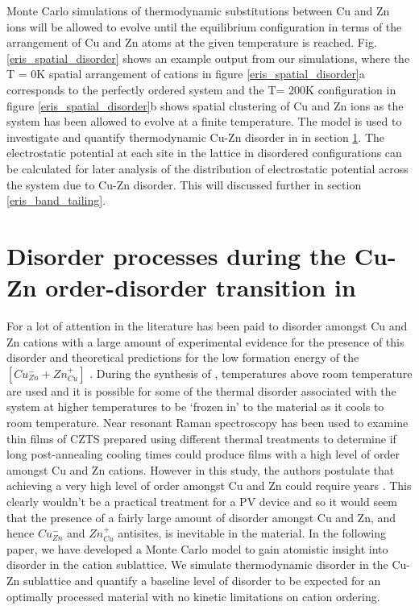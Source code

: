\documentclass[11pt, twoside]{report}
\begin{document}
Monte Carlo simulations of thermodynamic substitutions between Cu and Zn ions will be allowed to evolve until the equilibrium configuration in terms of the arrangement of Cu and Zn atoms at the given temperature is reached. Fig. \ref{eris_spatial_disorder} shows an example output from our simulations, where the T = 0K spatial arrangement of cations in figure \ref{eris_spatial_disorder}a corresponds to the perfectly ordered system and the T= 200K configuration in figure \ref{eris_spatial_disorder}b shows spatial clustering of Cu and Zn ions as the system has been allowed to evolve at a finite temperature. The model is used to investigate and quantify thermodynamic Cu-Zn disorder in {\CZTS} in section \ref{CZTS_MC}. The electrostatic potential at each site in the lattice in disordered configurations can be calculated for later analysis of the distribution of electrostatic potential across the system due to Cu-Zn disorder. This will discussed further in section \ref{eris_band_tailing}. 




\section{Disorder processes during the Cu-Zn order-disorder transition in {\CZTS}}\label{CZTS_MC}
For {\CZTS} a lot of attention in the literature has been paid to disorder amongst Cu and Zn cations with a large amount of experimental evidence for the presence of this disorder \cite{Schorr, CZTS_Xray, CZTS_TEM} and theoretical predictions for the low formation energy of the  $[Cu_{Zn}^{-} + Zn_{Cu}^{+}]$ \cite{defects_Chen}.
During the synthesis of {\CZTS}, temperatures above room temperature are used and it is possible for some of the thermal disorder associated with the system at higher temperatures to be `frozen in' to the material as it cools to room temperature.
Near resonant Raman spectroscopy has been used to examine thin films of CZTS prepared using different thermal treatments to determine if long post-annealing cooling times could produce films with a high level of order amongst Cu and Zn cations. However in this study, the authors postulate that achieving a very high level of order amongst Cu and Zn could require years \cite{Katharina}. This clearly wouldn't be a practical treatment for a PV device and so it would seem that the presence of a fairly large amount of disorder amongst Cu and Zn, and hence $Cu_{Zn}^{-}$ and $Zn_{Cu}^{+}$ antisites,  is inevitable in the material. In the following paper, we have developed a Monte Carlo model to gain atomistic insight into disorder in the cation sublattice. We simulate thermodynamic disorder in the Cu-Zn sublattice and quantify a baseline level of disorder to be expected for an optimally processed material with no kinetic limitations on cation ordering.
\end{document}
